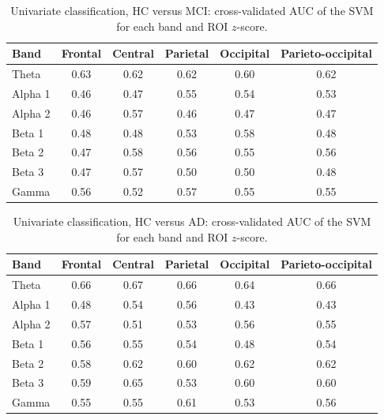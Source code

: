 \documentclass[11pt]{article}
\begin{document}
\begin{table}[ht]
\centering
\caption{Univariate classification, HC versus MCI: cross-validated AUC of the SVM for each band and ROI $z$-score.}
\label{tab:uni_mci}
\small
\begin{tabular}{@{}lccccc@{}}
\toprule
Band & Frontal & Central & Parietal & Occipital & Parieto-occipital \\
\midrule
Theta & 0.63 & 0.62 & 0.62 & 0.60 & 0.62 \\
Alpha 1 & 0.46 & 0.47 & 0.55 & 0.54 & 0.53 \\
Alpha 2 & 0.46 & 0.57 & 0.46 & 0.47 & 0.47 \\
Beta 1 & 0.48 & 0.48 & 0.53 & 0.58 & 0.48 \\
Beta 2 & 0.47 & 0.58 & 0.56 & 0.55 & 0.56 \\
Beta 3 & 0.47 & 0.57 & 0.50 & 0.50 & 0.48 \\
Gamma & 0.56 & 0.52 & 0.57 & 0.55 & 0.55 \\
\bottomrule
\end{tabular}
\end{table}

\begin{table}[ht]
\centering
\caption{Univariate classification, HC versus AD: cross-validated AUC of the SVM for each band and ROI $z$-score.}
\label{tab:uni_ad}
\small
\begin{tabular}{@{}lccccc@{}}
\toprule
Band & Frontal & Central & Parietal & Occipital & Parieto-occipital \\
\midrule
Theta & 0.66 & 0.67 & 0.66 & 0.64 & 0.66 \\
Alpha 1 & 0.48 & 0.54 & 0.56 & 0.43 & 0.43 \\
Alpha 2 & 0.57 & 0.51 & 0.53 & 0.56 & 0.55 \\
Beta 1 & 0.56 & 0.55 & 0.54 & 0.48 & 0.54 \\
Beta 2 & 0.58 & 0.62 & 0.60 & 0.62 & 0.62 \\
Beta 3 & 0.59 & 0.65 & 0.53 & 0.60 & 0.60 \\
Gamma & 0.55 & 0.55 & 0.61 & 0.53 & 0.56 \\
\bottomrule
\end{tabular}
\end{table}
\end{document}
